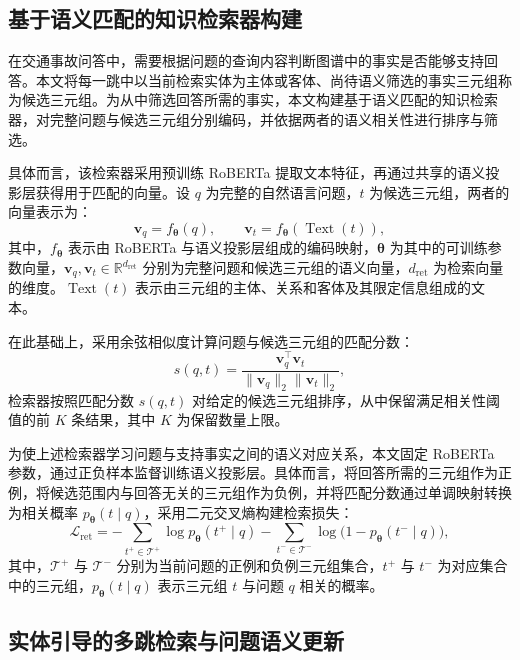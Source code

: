 \subsection{基于语义匹配的知识检索器构建}

在交通事故问答中，需要根据问题的查询内容判断图谱中的事实是否能够支持回答。本文将每一跳中以当前检索实体为主体或客体、尚待语义筛选的事实三元组称为候选三元组。为从中筛选回答所需的事实，本文构建基于语义匹配的知识检索器，对完整问题与候选三元组分别编码，并依据两者的语义相关性进行排序与筛选。

具体而言，该检索器采用预训练 RoBERTa 提取文本特征，再通过共享的语义投影层获得用于匹配的向量。设 $q$ 为完整的自然语言问题，$t$ 为候选三元组，两者的向量表示为：
\begin{equation}
\bm{v}_q=f_{\bm{\theta}}(q),\qquad
\bm{v}_{t}=f_{\bm{\theta}}(\operatorname{Text}(t)),
\end{equation}
其中，$f_{\bm{\theta}}$ 表示由 RoBERTa 与语义投影层组成的编码映射，$\bm{\theta}$ 为其中的可训练参数向量，$\bm{v}_q,\bm{v}_t\in\mathbb{R}^{d_{\mathrm{ret}}}$ 分别为完整问题和候选三元组的语义向量，$d_{\mathrm{ret}}$ 为检索向量的维度。$\operatorname{Text}(t)$ 表示由三元组的主体、关系和客体及其限定信息组成的文本。

在此基础上，采用余弦相似度计算问题与候选三元组的匹配分数：
\begin{equation}
s(q,t)=
\frac{\bm{v}_{q}^{\top}\bm{v}_{t}}
{\lVert\bm{v}_{q}\rVert_2\lVert\bm{v}_{t}\rVert_2},
\end{equation}
检索器按照匹配分数 $s(q,t)$ 对给定的候选三元组排序，从中保留满足相关性阈值的前 $K$ 条结果，其中 $K$ 为保留数量上限。

为使上述检索器学习问题与支持事实之间的语义对应关系，本文固定 RoBERTa 参数，通过正负样本监督训练语义投影层。具体而言，将回答所需的三元组作为正例，将候选范围内与回答无关的三元组作为负例，并将匹配分数通过单调映射转换为相关概率 $p_{\bm{\theta}}(t\mid q)$，采用二元交叉熵构建检索损失：
\begin{equation}
\mathcal{L}_{\mathrm{ret}}
=-\sum_{t^+\in\mathcal{T}^{+}}\log p_{\bm{\theta}}(t^+\mid q)
-\sum_{t^-\in\mathcal{T}^{-}}\log\bigl(1-p_{\bm{\theta}}(t^-\mid q)\bigr),
\end{equation}
其中，$\mathcal{T}^{+}$ 与 $\mathcal{T}^{-}$ 分别为当前问题的正例和负例三元组集合，$t^{+}$ 与 $t^{-}$ 为对应集合中的三元组，$p_{\bm{\theta}}(t\mid q)$ 表示三元组 $t$ 与问题 $q$ 相关的概率。

\subsection{实体引导的多跳检索与问题语义更新}


